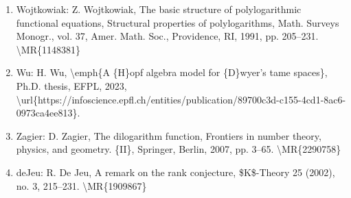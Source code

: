 \documentclass[11pt]{article}
\begin{document}
\begin{enumerate}[leftmargin=*]
  \item Wojtkowiak: Z. Wojtkowiak, The basic structure of polylogarithmic functional equations, Structural properties of polylogarithms, Math. Surveys Monogr., vol. 37, Amer. Math. Soc., Providence, RI, 1991, pp. 205--231. \textbackslash{}MR\{1148381\}
  \item Wu: H. Wu, \textbackslash{}emph\{A \{H\}opf algebra model for \{D\}wyer's tame spaces\}, Ph.D. thesis, EFPL, 2023, \textbackslash{}url\{https://infoscience.epfl.ch/entities/publication/89700c3d-c155-4cd1-8ac6-0973ca4ee813\}.
  \item Zagier: D. Zagier, The dilogarithm function, Frontiers in number theory, physics, and geometry. \{II\}, Springer, Berlin, 2007, pp. 3--65. \textbackslash{}MR\{2290758\}
  \item deJeu: R. De Jeu, A remark on the rank conjecture, \$K\$-Theory 25 (2002), no. 3, 215--231. \textbackslash{}MR\{1909867\}
\end{enumerate}

% 
% 
\end{document}
